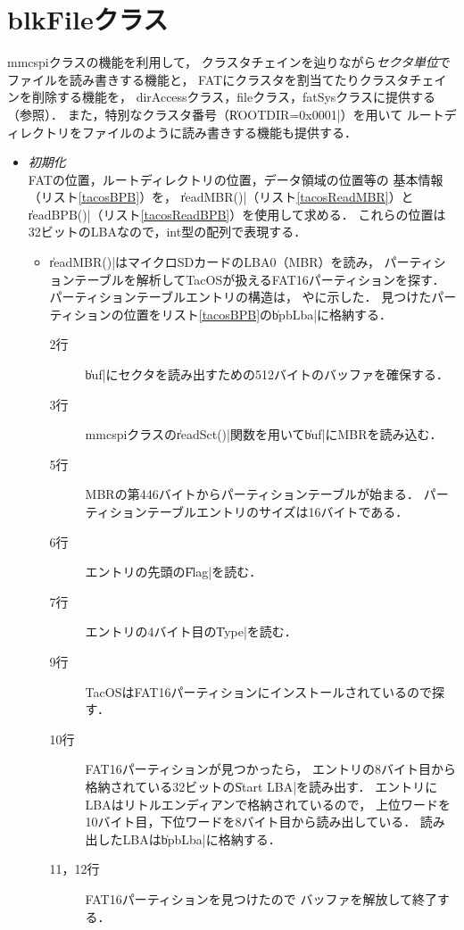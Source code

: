 \section{blkFileクラス}
\label{readBlkFile}
mmcspiクラスの機能を利用して，
クラスタチェインを辿りながら\emph{セクタ単位}でファイルを読み書きする機能と，
FATにクラスタを割当てたりクラスタチェインを削除する機能を，
dirAccessクラス，fileクラス，fatSysクラスに提供する（参照）．
また，特別なクラスタ番号（\|ROOTDIR=0x0001|）を用いて
ルートディレクトリをファイルのように読み書きする機能も提供する．

\begin{itemize}
\item \emph{初期化}\\
  FATの位置，ルートディレクトリの位置，データ領域の位置等の
  基本情報（リスト\ref{tacosBPB}）を，
  \|readMBR()|（リスト\ref{tacosReadMBR}）と
  \|readBPB()|（リスト\ref{tacosReadBPB}）を使用して求める．
  これらの位置は32ビットのLBAなので，int型の配列で表現する．

  

  \begin{itemize}
  \item \|readMBR()|はマイクロSDカードのLBA0（MBR）を読み，
    パーティションテーブルを解析してTacOSが扱えるFAT16パーティションを探す．
    パーティションテーブルエントリの構造は，
    やに示した．
    見つけたパーティションの位置をリスト\ref{tacosBPB}の\|bpbLba|に格納する．
  
    

    \begin{description}
    \item[2行] \|buf|にセクタを読み出すための512バイトのバッファを確保する．
    \item[3行] mmcspiクラスの\|readSct()|関数を用いて\|buf|にMBRを読み込む．
    \item[5行] MBRの第446バイトからパーティションテーブルが始まる．
      パーティションテーブルエントリのサイズは16バイトである．
    \item[6行] エントリの先頭の\|Flag|を読む．
    \item[7行] エントリの4バイト目の\|Type|を読む．
    \item[9行] TacOSはFAT16パーティションにインストールされているので探す．
    \item[10行] FAT16パーティションが見つかったら，
      エントリの8バイト目から格納されている32ビットの\|Start LBA|を読み出す．
      エントリにLBAはリトルエンディアンで格納されているので，
      上位ワードを10バイト目，下位ワードを8バイト目から読み出している．
      読み出したLBAは\|bpbLba|に格納する．
    \item[11，12行] FAT16パーティションを見つけたので
      バッファを解放して終了する．
    \end{description}


\end{itemize}
\end{itemize}
